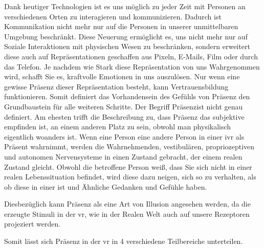 \documentclass[a4paper,11pt]{article}%
\renewcommand{\\}{\vspace*{0.5\baselineskip} \newline}
\begin{document}
			Dank heutiger Technologien ist es uns möglich zu jeder Zeit mit Personen an verschiedenen Orten zu interagieren und kommunizieren. Dadurch ist Kommunikation nicht mehr nur auf die Personen in unserer unmittelbaren Umgebung beschränkt. 
			Diese Neuerung ermöglicht es, uns nicht mehr nur auf Soziale Interaktionen mit physischen Wesen zu beschränken, sondern erweitert diese auch auf Repräsentationen geschaffen aus Pixeln, E-Mails, Film oder durch das Telefon. Je nachdem wie Stark diese Repräsentation von uns Wahrgenommen wird, schafft Sie es, kraftvolle Emotionen in uns auszulösen.\citep[p. 4-6]{biocca2002defining}\\
			Nur wenn eine gewisse Präsenz dieser Repräsentation besteht, kann Vertrauensbildung funktionieren. Somit definiert das Vorhandensein des Gefühls von Präsenz den Grundbaustein für alle weiteren Schritte.\\
			Der Begriff \flqq Präsenz\frqq ist nicht genau definiert. Am ehesten trifft die Beschreibung zu, dass Präsenz das subjektive empfinden ist, an einem anderen Platz zu sein, obwohl man physikalisch eigentlich woanders ist. \citep[p. 1]{witmer1998measuring}\\
			Wenn eine Person eine andere Person in einer \ac{ivr} als Präsent wahrnimmt, werden die Wahrnehmenden, vestibulären, propriozeptiven und autonomen Nervensysteme in einen Zustand gebracht, der einem realen Zustand gleicht. Obwohl die betroffene Person weiß, dass Sie sich nicht in einer realen Lebenssituation befindet, wird diese dazu neigen, sich so zu verhalten, als ob diese in einer ist und Ähnliche Gedanken und Gefühle haben. \citep{slater2003note}

Diesbezüglich kann Präsenz als eine Art von Illusion angesehen werden, da die erzeugte Stimuli in der \ac{vr}, wie in der Realen Welt auch auf unsere Rezeptoren projeziert werden.

Somit lässt sich Präsenz in der \ac{vr} in 4 verschiedene Teilbereiche unterteilen.
\end{document}
